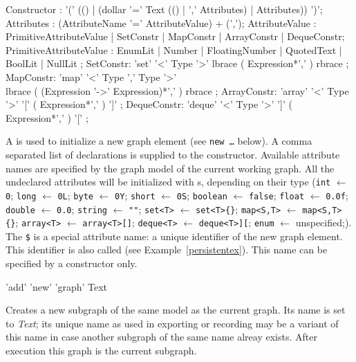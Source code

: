 \begin{rail}
  Constructor : '(' (() | (dollar '=' Text (() | ',' Attributes) | Attributes)) ')';
  Attributes : (AttributeName '=' AttributeValue) + (',');
  AttributeValue :  PrimitiveAttributeValue | SetConstr | MapConstr | ArrayConstr | DequeConstr;
  PrimitiveAttributeValue : EnumLit | Number | FloatingNumber | QuotedText | BoolLit | NullLit ;
  SetConstr: 'set' '<' Type '>' lbrace ( Expression*',' ) rbrace ;
  MapConstr: 'map' '<' Type ',' Type '>' \\ lbrace ( (Expression '->' Expression)*',' ) rbrace ;
  ArrayConstr: 'array' '<' Type '>' '[' ( Expression*',' ) ']' ;
  DequeConstr: 'deque' '<' Type '>' ']' ( Expression*',' ) '[' ;
\end{rail}\indexmain{\texttt{\$}}
A  is used to initialize a new graph element (see \texttt{new \dots} below).
A comma separated list of  declarations is supplied to the constructor.
Available attribute names are specified by the graph model of the current working graph.
All the undeclared attributes will be initialized with s, depending on their type
(\texttt{int} $\leftarrow$ \texttt{0}; \texttt{long} $\leftarrow$ \texttt{0L}; \texttt{byte} $\leftarrow$ \texttt{0Y}; \texttt{short} $\leftarrow$ \texttt{0S}; \texttt{boolean} $\leftarrow$ \texttt{false}; \texttt{float} $\leftarrow$ \texttt{0.0f}; \texttt{double} $\leftarrow$ \texttt{0.0}; \texttt{string} $\leftarrow$ \texttt{""}; \texttt{set<T>} $\leftarrow$ \texttt{set<T>\{\}}; \texttt{map<S,T>} $\leftarrow$ \texttt{map<S,T>\{\}}; \texttt{array<T>} $\leftarrow$ \texttt{array<T>[]}; \texttt{deque<T>} $\leftarrow$ \texttt{deque<T>][}; \texttt{enum} $\leftarrow$ unspecified;).\\
The \texttt{\$} is a special attribute name: a unique identifier of the new graph element.
This identifier is also called  (see Example~\ref{persistentex}).
This name can be specified by a constructor only.

\begin{rail}
  'add' 'new' 'graph' Text
\end{rail}
Creates a new subgraph of the same model as the current graph.
Its name is set to \emph{Text}; its unique name as used in exporting or recording may be a variant of this name in case another subgraph of the same name alreay exists.
After execution this graph is the current subgraph.

